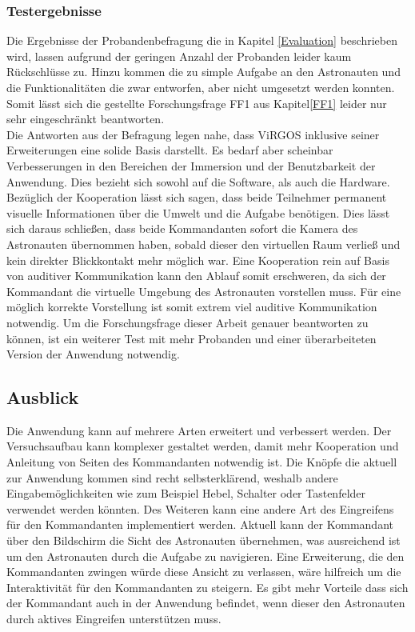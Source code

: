 \subsubsection{Testergebnisse}

Die Ergebnisse der Probandenbefragung die in Kapitel \ref{Evaluation} beschrieben wird, lassen aufgrund der geringen Anzahl der Probanden leider kaum Rückschlüsse zu. Hinzu kommen die zu simple Aufgabe an den Astronauten und die Funktionalitäten die zwar entworfen, aber nicht umgesetzt werden konnten. Somit lässt sich die gestellte Forschungsfrage FF1 aus Kapitel\ref{FF1} leider nur sehr eingeschränkt beantworten.\\

Die Antworten aus der Befragung legen nahe, dass ViRGOS inklusive seiner Erweiterungen eine solide Basis darstellt. Es bedarf aber scheinbar Verbesserungen in den Bereichen der Immersion und der Benutzbarkeit der Anwendung. Dies bezieht sich sowohl auf die Software, als auch die Hardware.\\

Bezüglich der Kooperation lässt sich sagen, dass beide Teilnehmer permanent visuelle Informationen über die Umwelt und die Aufgabe benötigen. Dies lässt sich daraus schließen, dass beide Kommandanten sofort die Kamera des Astronauten übernommen haben, sobald dieser den virtuellen Raum verließ und kein direkter Blickkontakt mehr möglich war. Eine Kooperation rein auf Basis von auditiver Kommunikation kann den Ablauf somit erschweren, da sich der Kommandant die virtuelle Umgebung des Astronauten vorstellen muss. Für eine möglich korrekte Vorstellung ist somit extrem viel auditive Kommunikation notwendig. Um die Forschungsfrage dieser Arbeit genauer beantworten zu können, ist ein weiterer Test mit mehr Probanden und einer überarbeiteten Version der Anwendung notwendig.

\subsection{Ausblick} \label{Ausblick}

Die Anwendung kann auf mehrere Arten erweitert und verbessert werden. Der Versuchsaufbau kann komplexer gestaltet werden, damit mehr Kooperation und Anleitung von Seiten des Kommandanten notwendig ist. Die Knöpfe die aktuell zur Anwendung kommen sind recht selbsterklärend, weshalb andere Eingabemöglichkeiten wie zum Beispiel Hebel, Schalter oder Tastenfelder verwendet werden könnten. Des Weiteren kann eine andere Art des Eingreifens für den Kommandanten implementiert werden. Aktuell kann der Kommandant über den Bildschirm die Sicht des Astronauten übernehmen, was ausreichend ist um den Astronauten durch die Aufgabe zu navigieren. Eine Erweiterung, die den Kommandanten zwingen würde diese Ansicht zu verlassen, wäre hilfreich um die Interaktivität für den Kommandanten zu steigern. Es gibt mehr Vorteile dass sich der Kommandant auch in der Anwendung befindet, wenn dieser den Astronauten durch aktives Eingreifen unterstützen muss.\\

